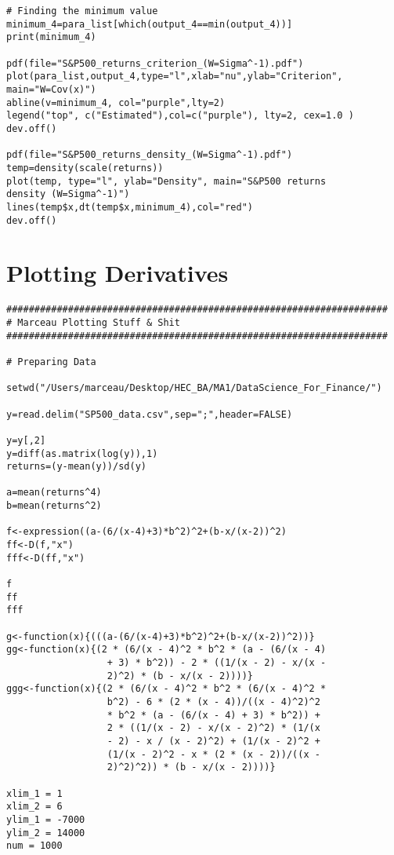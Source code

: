 \begin{appendices}
\begin{verbatim}
# Finding the minimum value
minimum_4=para_list[which(output_4==min(output_4))]
print(minimum_4)

pdf(file="S&P500_returns_criterion_(W=Sigma^-1).pdf")
plot(para_list,output_4,type="l",xlab="nu",ylab="Criterion",
main="W=Cov(x)")
abline(v=minimum_4, col="purple",lty=2)
legend("top", c("Estimated"),col=c("purple"), lty=2, cex=1.0 )
dev.off()

pdf(file="S&P500_returns_density_(W=Sigma^-1).pdf")
temp=density(scale(returns))
plot(temp, type="l", ylab="Density", main="S&P500 returns
density (W=Sigma^-1)")
lines(temp$x,dt(temp$x,minimum_4),col="red")       
dev.off()
\end{verbatim}

\chapter{Plotting Derivatives}

\begin{verbatim}
####################################################################
# Marceau Plotting Stuff & Shit
####################################################################

# Preparing Data

setwd("/Users/marceau/Desktop/HEC_BA/MA1/DataScience_For_Finance/")

y=read.delim("SP500_data.csv",sep=";",header=FALSE)

y=y[,2]
y=diff(as.matrix(log(y)),1)
returns=(y-mean(y))/sd(y)

a=mean(returns^4)
b=mean(returns^2)

f<-expression((a-(6/(x-4)+3)*b^2)^2+(b-x/(x-2))^2)
ff<-D(f,"x")
fff<-D(ff,"x")

f
ff
fff

g<-function(x){(((a-(6/(x-4)+3)*b^2)^2+(b-x/(x-2))^2))}
gg<-function(x){(2 * (6/(x - 4)^2 * b^2 * (a - (6/(x - 4)
                  + 3) * b^2)) - 2 * ((1/(x - 2) - x/(x -
                  2)^2) * (b - x/(x - 2))))}
ggg<-function(x){(2 * (6/(x - 4)^2 * b^2 * (6/(x - 4)^2 *
                  b^2) - 6 * (2 * (x - 4))/((x - 4)^2)^2
                  * b^2 * (a - (6/(x - 4) + 3) * b^2)) +
                  2 * ((1/(x - 2) - x/(x - 2)^2) * (1/(x
                  - 2) - x / (x - 2)^2) + (1/(x - 2)^2 +
                  (1/(x - 2)^2 - x * (2 * (x - 2))/((x -
                  2)^2)^2)) * (b - x/(x - 2))))}

xlim_1 = 1
xlim_2 = 6
ylim_1 = -7000
ylim_2 = 14000
num = 1000
  

\end{verbatim}
\end{appendices}
